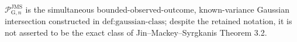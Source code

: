 \(\mathcal P_{\mathrm G,n}^{\mathrm{JMS}}\) is the simultaneous bounded-observed-outcome, known-variance Gaussian intersection constructed in \(\text{def:gaussian-class}\); despite the retained notation, it is not asserted to be the exact class of Jin--Mackey--Syrgkanis Theorem 3.2.
